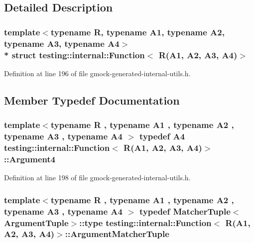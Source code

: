 \subsection{Detailed Description}
\subsubsection*{template$<$typename R, typename A1, typename A2, typename A3, typename A4$>$\\*
struct testing\+::internal\+::\+Function$<$ R(\+A1, A2, A3, A4)$>$}



Definition at line 196 of file gmock-\/generated-\/internal-\/utils.\+h.



\subsection{Member Typedef Documentation}
\subsubsection[{\texorpdfstring{Argument4}{Argument4}}]{\setlength{\rightskip}{0pt plus 5cm}template$<$typename R , typename A1 , typename A2 , typename A3 , typename A4 $>$ typedef A4 {\bf testing\+::internal\+::\+Function}$<$ {\bf R}(A1, A2, A3, A4)$>$\+::{\bf Argument4}}\hypertarget{structtesting_1_1internal_1_1_function_3_01_r_07_a1_00_01_a2_00_01_a3_00_01_a4_08_4_ae5039423598ab0fecd4f594acbf34d85}{}\label{structtesting_1_1internal_1_1_function_3_01_r_07_a1_00_01_a2_00_01_a3_00_01_a4_08_4_ae5039423598ab0fecd4f594acbf34d85}


Definition at line 198 of file gmock-\/generated-\/internal-\/utils.\+h.

\subsubsection[{\texorpdfstring{Argument\+Matcher\+Tuple}{ArgumentMatcherTuple}}]{\setlength{\rightskip}{0pt plus 5cm}template$<$typename R , typename A1 , typename A2 , typename A3 , typename A4 $>$ typedef {\bf Matcher\+Tuple}$<${\bf Argument\+Tuple}$>$\+::type {\bf testing\+::internal\+::\+Function}$<$ {\bf R}(A1, A2, A3, A4)$>$\+::{\bf Argument\+Matcher\+Tuple}}\hypertarget{structtesting_1_1internal_1_1_function_3_01_r_07_a1_00_01_a2_00_01_a3_00_01_a4_08_4_a9524b18868ab632a90d4cb6917057a14}{}\label{structtesting_1_1internal_1_1_function_3_01_r_07_a1_00_01_a2_00_01_a3_00_01_a4_08_4_a9524b18868ab632a90d4cb6917057a14}


